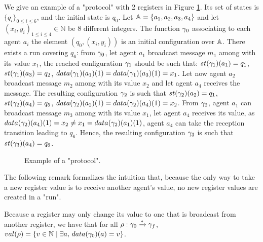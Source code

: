 \begin{example}\label{example-1}
	We give an example of a "protocol" with 2 registers in Figure \ref{fig:ex1}. Its set of states is $\{q_i\}_{0 \leq i \leq 6}$, and the initial state is $q_0$. Let $\mathbb{A} = \{a_1, a_2, a_3, a_4\}$ and let $(x_i, y_i)_{1 \leq i \leq 4} \in \mathbb{N}$ be 8 different integers. The function $\gamma_0$ associating to each agent $a_i$ the element $(q_0, (x_i, y_i))$ is an initial configuration over $\mathbb{A}$. There exists a run covering $q_6$: from $\gamma_0$, let agent $a_1$ broadcast message $m_1$ among with its value $x_1$, the reached configuration $\gamma_1$ should be such that: $\st{\config_1}(a_1)= q_1$, $\st{\config_1}(a_3)= q_2$, $\data{\config_1}(a_1)(1) = \data{\config_1}(a_3)(1) = x_1$. Let now agent $a_2$ broadcast message $m_2$ among with its value $x_2$ and let agent $a_4$ receives the message. The resulting configuration $\gamma_2$ is such that $\st{\config_2}(a_2)= q_1$, $\st{\config_2}(a_4)= q_5$, $\data{\config_2}(a_2)(1) = \data{\config_2}(a_4)(1) = x_2$. From $\gamma_2$, agent $a_1$ can broadcast message $m_3$ among with its value $x_1$, let agent $a_4$ receives its value, as $\data{\config_2}(a_4)(1) = x_2 \ne x_1 = \data{\config_2}(a_1)(1)$, agent $a_4$ can take the reception transition leading to $q_6$. Hence, the resulting configuration $\gamma_3$ is such that $\st{\config_3}(a_4)= q_6$. 
\end{example}

\begin{figure}
	
	\caption{Example of a "protocol".}\label{fig:ex1}
\end{figure}
	
	
The following remark formalizes the intuition that, because the only way to take a new register value is to receive another agent's value, no new register values are created in a "run".
\begin{remark}
	\label{rem:run_no_new_register_values}
	Because a register may only change its value to one that is broadcast from another register, we have that for all $\rho: \gamma_0 \xrightarrow{*} \gamma_f$, $\valsof{\run} = \set{\aval \in \nats \mid \exists a, \, \data{\config_0}(a) = \aval}$.
\end{remark}

